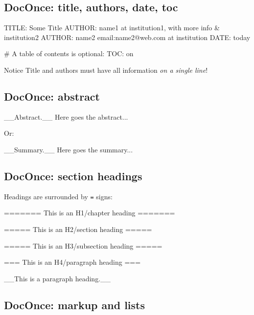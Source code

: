 \documentclass[%
oneside,                 %
final,                   %
10pt]{article}
\begin{document}
\subsection{DocOnce: title, authors, date, toc}









\bdat
TITLE: Some Title
AUTHOR: name1 at institution1, with more info & institution2
AUTHOR: name2 email:name2@web.com at institution
DATE: today

# A table of contents is optional:
TOC: on

\edat


\begin{block}{Notice}
Title and authors must have all information \emph{on a single line}!
\end{block}

\subsection{DocOnce: abstract}




\bdat
__Abstract.__
Here goes the abstract...

\edat


Or:



\bdat
__Summary.__
Here goes the summary...

\edat


\subsection{DocOnce: section headings}

Headings are surrounded by \texttt{=} signs:










\bdat
======= This is an H1/chapter heading =======

===== This is an H2/section heading =====

===== This is an H3/subsection heading =====

=== This is an H4/paragraph heading ===

__This is a paragraph heading.__

\edat


\subsection{DocOnce: markup and lists}
\end{document}
